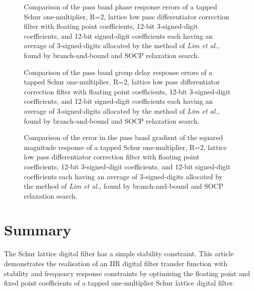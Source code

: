 \documentclass[a4paper,twoside,10pt,english]{article}
\newcommand{\DesignOfSchurLatticeFiltersPdfScale}{1}
\begin{document}
\begin{figure}[!hb]
\centering
\scalebox{\DesignOfSchurLatticeFiltersPdfScale}{}
\caption{Comparison of the pass band phase response errors of a tapped Schur
  one-multiplier, R=2, lattice low pass differentiator correction filter with
  floating point coefficients, 12-bit 3-signed-digit coefficients, and 12-bit
  signed-digit coefficients each having an average of 3-signed-digits allocated
  by the method of \emph{Lim et al.}, found by branch-and-bound and
  SOCP relaxation search.}
\label{fig:Comp-schurOneMlattice-lowpass-diff-R2-12-nbits-phase}
\end{figure}

\begin{figure}[!hb]
\centering
\scalebox{\DesignOfSchurLatticeFiltersPdfScale}{}
\caption{Comparison of the pass band group delay response errors of a tapped
  Schur one-multiplier, R=2, lattice low pass differentiator correction filter
  with floating point coefficients, 12-bit 3-signed-digit coefficients, and
  12-bit signed-digit coefficients each having an average of 3-signed-digits
  allocated by the method of \emph{Lim et al.}, found by branch-and-bound and
  SOCP relaxation search.}
\label{fig:Comp-schurOneMlattice-lowpass-diff-R2-12-nbits-delay}
\end{figure}

\begin{figure}[!hb]
\centering
\scalebox{\DesignOfSchurLatticeFiltersPdfScale}{}
\caption{Comparison of the error in the pass band gradient of the squared
  magnitude response of a tapped Schur one-multiplier, R=2, lattice low pass
  differentiator correction filter with floating point coefficients, 12-bit
  3-signed-digit coefficients, and 12-bit signed-digit coefficients each having
  an average of 3-signed-digits allocated by the method of \emph{Lim et al.},
  found by branch-and-bound and SOCP relaxation search.}
\label{fig:Comp-schurOneMlattice-lowpass-diff-R2-12-nbits-dAsqdw}
\end{figure}

\clearpage

\section{Summary}
The Schur lattice digital filter has a simple stability constraint. This article
demonstrates the realisation of an IIR digital filter transfer function with
stability and frequency response constraints by optimising the floating point
and fixed point coefficients of a tapped one-multiplier Schur lattice digital
filter.



\end{document}
